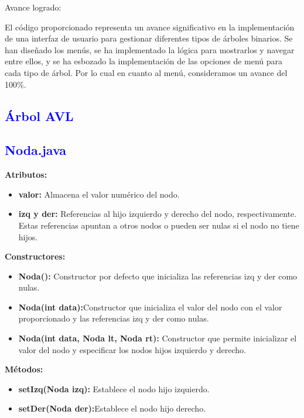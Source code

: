 \documentclass[12pt]{article}
\begin{document}
Avance logrado:
\par\vspace{0cm}
El código proporcionado representa un avance significativo en la implementación de una interfaz de usuario para gestionar diferentes tipos de árboles binarios. Se han diseñado los menús, se ha implementado la lógica para mostrarlos y navegar entre ellos, y se ha esbozado la implementación de las opciones de menú para cada tipo de árbol. Por lo cual en cuanto al menú, consideramos un avance del 100\%.

\subsection*{\textcolor{blue}{Árbol AVL}}
\subsection{\textcolor{blue}{Noda.java}}

\textbf{Atributos:}
\begin{itemize}
    \item \textbf{valor:} Almacena el valor numérico del nodo.
    
    \item \textbf{izq y der:} Referencias al hijo izquierdo y derecho del nodo, respectivamente. Estas referencias apuntan a otros nodos o pueden ser nulas si el nodo no tiene hijos.
\end{itemize}

\textbf{Constructores:}
\begin{itemize}
    \item \textbf{Noda():} Constructor por defecto que inicializa las referencias izq y der como nulas.
    
    \item \textbf{Noda(int data):}Constructor que inicializa el valor del nodo con el valor proporcionado y las referencias izq y der como nulas.
    
     \item \textbf{Noda(int data, Noda lt, Noda rt): }Constructor que permite inicializar el valor del nodo y especificar los nodos hijos izquierdo y derecho.
\end{itemize}

\textbf{Métodos:}
\begin{itemize}
    \item \textbf{setIzq(Noda izq): }Establece el nodo hijo izquierdo.
    
    \item \textbf{setDer(Noda der):}Establece el nodo hijo derecho.
\end{itemize}
\end{document}
